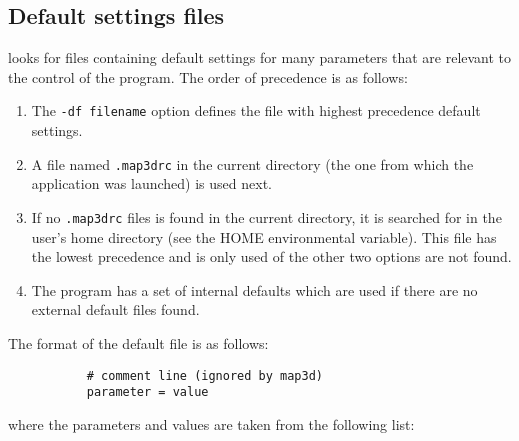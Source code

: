 \subsection{Default settings files}
\label{sec:defaults} 

\map{} looks for files containing default settings for
many parameters that are relevant to the control of the program.
The order of precedence is as follows:
%
\begin{enumerate}
  \item The {\tt-df filename} option defines the file with highest
        precedence default settings.
  \item A file named {\tt .map3drc} in the current directory (the one from
        which the application was launched) is used next.
  \item If no {\tt .map3drc} files is found in the current directory, it is
        searched for in the user's home directory (see the HOME
        environmental variable).  This file has the lowest precedence and
        is only used of the other two options are not found.
  \item The program \map{} has a set of internal defaults which are used
        if there are no external default files found.
\end{enumerate}

\newpage
The format of the default file is as follows:
%
\begin{verbatim}
           # comment line (ignored by map3d)
           parameter = value
\end{verbatim}

\noindent
where the parameters and values are taken from the following list:

